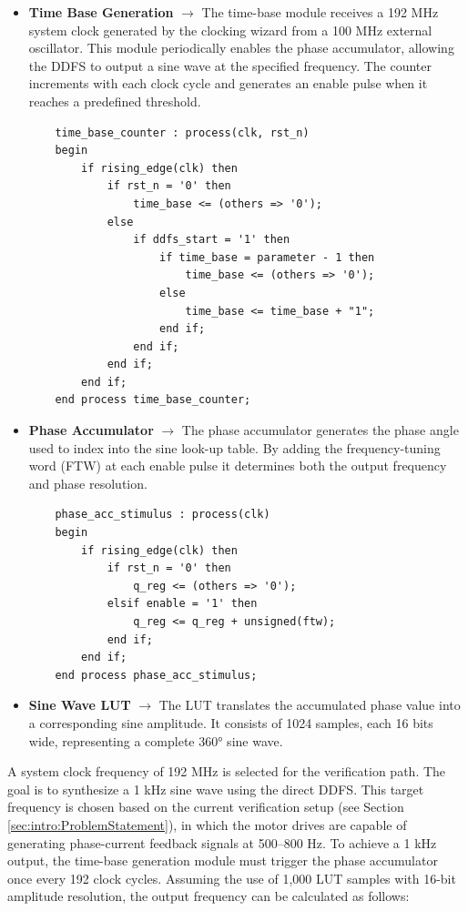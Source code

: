 \begin{itemize}
	\item \textbf{Time Base Generation} $\rightarrow$ The time-base module receives a 192 MHz system clock generated by the clocking wizard from a 100 MHz external oscillator. This module periodically enables the phase accumulator, allowing the \acs{DDFS} to output a sine wave at the specified frequency. The counter increments with each clock cycle and generates an enable pulse when it reaches a predefined threshold.
	
	\begin{lstlisting}
 	time_base_counter : process(clk, rst_n)
	begin
		if rising_edge(clk) then
			if rst_n = '0' then
				time_base <= (others => '0');
			else
				if ddfs_start = '1' then
					if time_base = parameter - 1 then
						time_base <= (others => '0');
					else
						time_base <= time_base + "1";
					end if;
				end if;
			end if;
		end if;       	
	end process time_base_counter;
	\end{lstlisting}
	
	\item \textbf{Phase Accumulator} $\rightarrow$ The phase accumulator generates the phase angle used to index into the sine look-up table. By adding the frequency-tuning word (FTW) at each enable pulse it determines both the output frequency and phase resolution.
	
	\begin{lstlisting}
	phase_acc_stimulus : process(clk) 
	begin
		if rising_edge(clk) then
			if rst_n = '0' then
				q_reg <= (others => '0');
			elsif enable = '1' then
				q_reg <= q_reg + unsigned(ftw);
			end if;
		end if;
	end process phase_acc_stimulus;
	\end{lstlisting}
	
	\item \textbf{Sine Wave \acs{LUT}} $\rightarrow$ The \acs{LUT} translates the accumulated phase value into a corresponding sine amplitude. It consists of 1024 samples, each 16 bits wide, representing a complete 360° sine wave.
\end{itemize}

A system clock frequency of 192 MHz is selected for the verification path. The goal is to synthesize a 1 kHz sine wave using the direct \acs{DDFS}. This target frequency is chosen based on the current verification setup (see Section \ref{sec:intro:ProblemStatement}), in which the motor drives are capable of generating phase-current feedback signals at 500–800 Hz. To achieve a 1 kHz output, the time-base generation module must trigger the phase accumulator once every 192 clock cycles. Assuming the use of 1,000 \acs{LUT} samples with 16-bit amplitude resolution, the output frequency can be calculated as follows:

